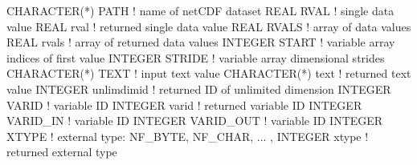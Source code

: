 \begin{DoxyCode}
CHARACTER(*)  PATH         ! name of netCDF dataset
REAL          RVAL         ! single data value
REAL          rval         ! returned single data value
REAL          RVALS        ! array of data values
REAL          rvals        ! array of returned data values
INTEGER       START        ! variable array indices of first value
INTEGER       STRIDE       ! variable array dimensional strides
CHARACTER(*)  TEXT         ! input text value
CHARACTER(*)  text         ! returned text value
INTEGER       unlimdimid   ! returned ID of unlimited dimension
INTEGER       VARID        ! variable ID
INTEGER       varid        ! returned variable ID
INTEGER       VARID\_IN     ! variable ID
INTEGER       VARID\_OUT    ! variable ID
INTEGER       XTYPE        ! external type: NF\_BYTE, NF\_CHAR, ... ,
INTEGER       xtype        ! returned external type
\end{DoxyCode}
 